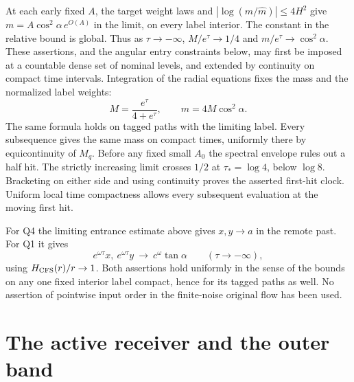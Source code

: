 \documentclass[11pt]{article}
\begin{document}
At each early fixed $A$, the target weight laws and
$|\log(m/\widehat m)|\le4H^2$ give
$m=A\cos^2\alpha\, e^{O(A)}$ in the limit, on every label interior.
The constant in the relative bound is global. Thus as $\tau\to-\infty$,
$M/e^\tau\to1/4$ and $m/e^\tau\to\cos^2\alpha$.
These assertions, and the angular entry constraints below, may first
be imposed at a countable dense set of nominal levels, and extended
by continuity on compact time intervals. Integration of the radial
equations fixes the mass and the normalized label weights:
\begin{equation}\label{an04hbdv1:clock}
 M=\frac{e^\tau}{4+e^\tau},\qquad m=4M\cos^2\alpha .
\end{equation}
The same formula holds on tagged paths with the limiting label.
Every subsequence gives the same mass on compact times, uniformly
there by equicontinuity of $M_q$. Before any fixed small $A_0$
the spectral envelope rules out a half hit. The strictly increasing
limit crosses $1/2$ at $\tau_*=\log4$, below $\log8$.
Bracketing on either side and using continuity proves the asserted
first-hit clock. Uniform local time compactness allows every
subsequent evaluation at the moving first hit.

For Q4 the limiting entrance estimate above gives $x,y\to a$
in the remote past. For Q1 it gives
\begin{equation}\label{an04hbdv1:incoming}
 e^{\omega\tau}x,\ e^{\omega\tau}y\ \longrightarrow\
 c^\omega\tan\alpha\qquad(\tau\to-\infty),
\end{equation}
using $H_{\rm CFS}(r)/r\to1$. Both assertions hold uniformly in the
sense of the bounds on any one fixed interior label compact, hence
for its tagged paths as well. No assertion of pointwise input order
in the finite-noise original flow has been used.

\section{The active receiver and the outer band}
\end{document}
